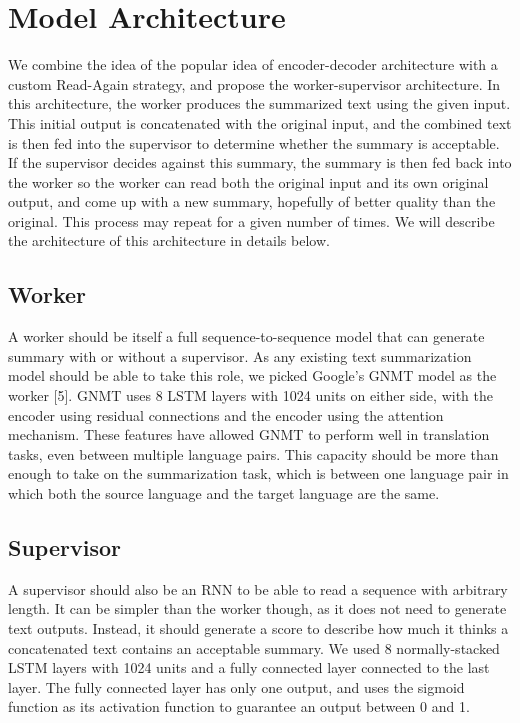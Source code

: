 \documentclass[letterpaper]{article} %
\begin{document}
\section{Model Architecture}
We combine the idea of the popular idea of encoder-decoder architecture with a custom Read-Again strategy, and propose the worker-supervisor architecture. In this architecture, the worker produces the summarized text using the given input. This initial output is concatenated with the original input, and the combined text is then fed into the supervisor to determine whether the summary is acceptable. If the supervisor decides against this summary, the summary is then fed back into the worker so the worker can read both the original input and its own original output, and come up with a new summary, hopefully of better quality than the original. This process may repeat for a given number of times. We will describe the architecture of this architecture in details below.

\subsection{Worker}
A worker should be itself a full sequence-to-sequence model that can generate summary with or without a supervisor. As any existing text summarization model should be able to take this role, we picked Google’s GNMT model as the worker [5]. GNMT uses 8 LSTM layers with 1024 units on either side, with the encoder using residual connections and the encoder using the attention mechanism. These features have allowed GNMT to perform well in translation tasks, even between multiple language pairs. This capacity should be more than enough to take on the summarization task, which is between one language pair in which both the source language and the target language are the same.

\subsection{Supervisor}
A supervisor should also be an RNN to be able to read a sequence with arbitrary length. It can be simpler than the worker though, as it does not need to generate text outputs. Instead, it should generate a score to describe how much it thinks a concatenated text contains an acceptable summary. We used 8 normally-stacked LSTM layers with 1024 units and a fully connected layer connected to the last layer. The fully connected layer has only one output, and uses the sigmoid function as its activation function to guarantee an output between 0 and 1.
\end{document}
